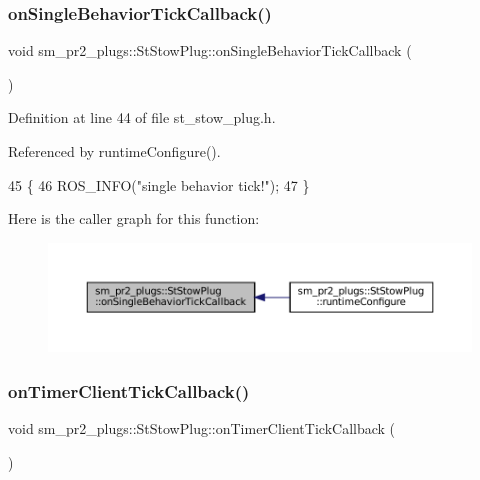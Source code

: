 \subsubsection{\texorpdfstring{on\+Single\+Behavior\+Tick\+Callback()}{onSingleBehaviorTickCallback()}}
{\footnotesize\ttfamily void sm\+\_\+pr2\+\_\+plugs\+::\+St\+Stow\+Plug\+::on\+Single\+Behavior\+Tick\+Callback (\begin{DoxyParamCaption}{ }\end{DoxyParamCaption})\hspace{0.3cm}{\ttfamily [inline]}}



Definition at line 44 of file st\+\_\+stow\+\_\+plug.\+h.



Referenced by runtime\+Configure().


\begin{DoxyCode}
45     \{
46         ROS\_INFO(\textcolor{stringliteral}{"single behavior tick!"});
47     \}
\end{DoxyCode}
Here is the caller graph for this function\+:
\nopagebreak
\begin{figure}[H]
\begin{center}
\leavevmode
\includegraphics[width=350pt]{structsm__pr2__plugs_1_1StStowPlug_a69f661686818a913827a9048ebe4d259_icgraph}
\end{center}
\end{figure}
\mbox{\label{structsm__pr2__plugs_1_1StStowPlug_ae757556cb3fd58c9db771327744973bf}} 
\subsubsection{\texorpdfstring{on\+Timer\+Client\+Tick\+Callback()}{onTimerClientTickCallback()}}
{\footnotesize\ttfamily void sm\+\_\+pr2\+\_\+plugs\+::\+St\+Stow\+Plug\+::on\+Timer\+Client\+Tick\+Callback (\begin{DoxyParamCaption}{ }\end{DoxyParamCaption})\hspace{0.3cm}{\ttfamily [inline]}}



